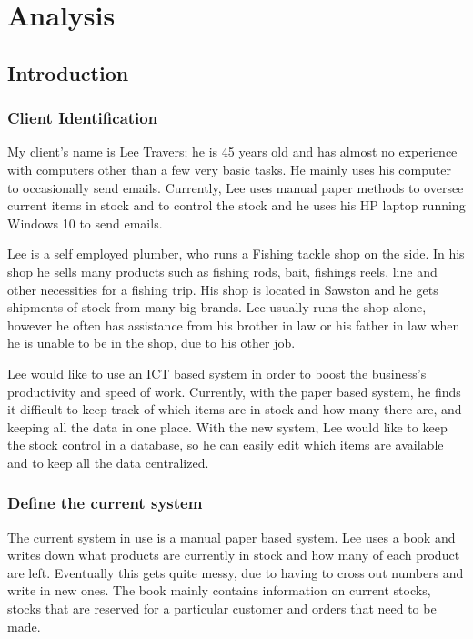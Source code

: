 \chapter{Analysis}

\section{Introduction}

\subsection{Client Identification}
My client's name is Lee Travers; he is 45 years old and has almost no experience with computers other than a few very basic tasks. He mainly uses his computer to occasionally send emails. Currently, Lee uses manual paper methods to oversee current items in stock and to control the stock and he uses his HP laptop running Windows 10 to send emails.

Lee is a self employed plumber, who runs a Fishing tackle shop on the side. In his shop he sells many products such as fishing rods, bait, fishings reels, line and other necessities for a fishing trip. His shop is located in Sawston and he gets shipments of stock from many big brands. Lee usually runs the shop alone, however he often has assistance from his brother in law or his father in law when he is unable to be in the shop, due to his other job.

Lee would like to use an ICT based system in order to boost the business's productivity and speed of work. Currently, with the paper based system, he finds it difficult to keep track of which items are in stock and how many there are, and keeping all the data in one place. With the new system, Lee would like to keep the stock control in a database, so he can easily edit which items are available and to keep all the data centralized.

\subsection{Define the current system}
The current system in use is a manual paper based system. Lee uses a book and writes down what products are currently in stock and how many of each product are left. Eventually this gets quite messy, due to having to cross out numbers and write in new ones. The book mainly contains information on current stocks, stocks that are reserved for a particular customer and orders that need to be made.

